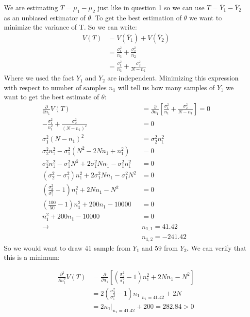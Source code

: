 \documentclass{article}
\newcommand{\1}{\mathbf{1}}
\begin{document}
We are estimating $T=\mu_1 - \mu_2$ just like in question 1 so we can use $T=\bar Y_1 - \bar Y_2$ as an unbiased estimator of $\theta$. To get the best estimation of $\theta$ we want to minimize the variance of T. So we can write:
\begin{align*}
    V(T) &= V(\bar Y_1) + V(\bar Y_2) \\
    &= \frac{\sigma^2_1}{n_1} + \frac{\sigma^2_2}{n_2} \\
    &= \frac{\sigma^2_1}{n_1} + \frac{\sigma^2_2}{N - n_1}
\end{align*}
Where we used the fact $Y_1$ and $Y_2$ are independent. Minimizing this expression with respect to number of samples $n_1$ will tell us how many samples of $Y_1$ we want to get the best estimate of $\theta$: 
\begin{align*}
    \frac{\partial}{\partial n_1} V(T) &=  \frac{\partial}{\partial n_1} \left[ \frac{\sigma^2_1}{n_1} + \frac{\sigma^2_2}{N - n_1} \right] = 0 \\
    -\frac{\sigma^2_1}{n_1^2} + \frac{\sigma^2_2}{(N - n_1)^2} &= 0\\
    \sigma^2_1 (N-n_1)^2 &= \sigma^2_2 n_1^2 \\
    \sigma^2_2 n_1^2 - \sigma^2_1 (N^2 -2Nn_1 + n_1^2) &= 0\\
    \sigma^2_2 n_1^2 - \sigma^2_1 N^2 + 2\sigma^2_1 Nn_1 - \sigma^2_1 n_1^2 &= 0\\
    (\sigma^2_2 - \sigma^2_1) n_1^2 + 2\sigma^2_1 Nn_1 - \sigma^2_1 N^2  &=0 \\
    \left(\frac{\sigma^2_2}{\sigma^2_1} - 1\right) n_1^2 + 2Nn_1 - N^2  &=0 \\
    \left(\frac{100}{50} - 1\right) n_1^2 + 200n_1 - 10000  &=0 \\
    n_1^2 + 200n_1 - 10000  &=0 \\
    \rightarrow &n_{1,1} = 41.42\\
    &n_{1,2} = -241.42
\end{align*}
So we would want to draw 41 sample from $Y_1$ and 59 from $Y_2$. We can verify that this is a minimum:

\begin{align*}
    \frac{\partial^2}{\partial n_1^2} V(T) &=  \frac{\partial}{\partial n_1} \left[\left(\frac{\sigma^2_2}{\sigma^2_1} - 1\right) n_1^2 + 2Nn_1 - N^2 \right]  \\
    &= 2\left(\frac{\sigma^2_2}{\sigma^2_1} - 1\right) n_1|_{n_1=41.42} + 2N   \\
    &= 2 n_1|_{n_1=41.42} + 200 = 282.84 > 0   \\
\end{align*}
\end{document}
